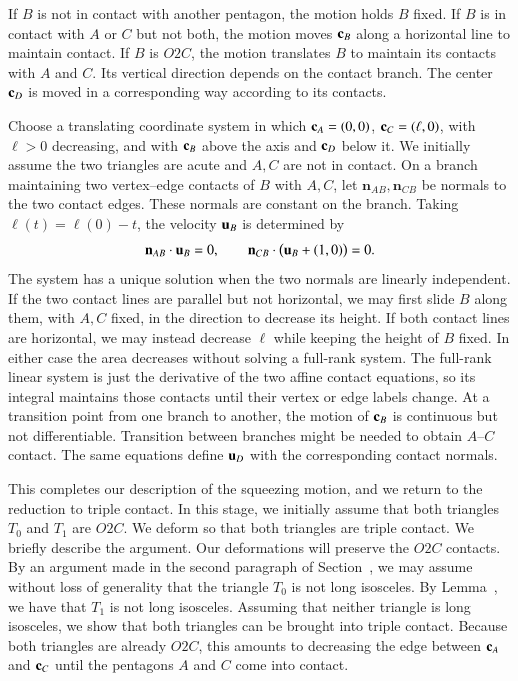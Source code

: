 If $B$ is not in contact with another pentagon, the motion holds $B$ fixed.
If $B$ is in contact with $A$ or $C$ but not both, the motion
moves ${\mathbf c}_B$ along a horizontal line to maintain contact.
If $B$ is $O2C$, the motion translates $B$ to maintain its contacts
with $A$ and $C$. Its vertical direction depends on the contact branch.
The center ${\mathbf c}_D$ is moved in a corresponding way according to its contacts.

Choose a translating coordinate system in which
${\mathbf c}_A=(0,0)$, ${\mathbf c}_C=(\ell,0)$, with $\ell>0$ decreasing,
and with ${\mathbf c}_B$ above the axis and ${\mathbf c}_D$ below it.  We
initially assume the two triangles are acute and $A,C$ are not
in contact.  On a branch maintaining two vertex--edge contacts of
$B$ with $A,C$, let $\mathbf{n}_{AB},\mathbf{n}_{CB}$ be normals to the two
contact edges.  These normals are constant on the branch.  Taking
$\ell(t)=\ell(0)-t$, the velocity ${\mathbf u}_B$ is determined by
\[
\mathbf{n}_{AB}\cdot {\mathbf u}_B=0,\qquad
\mathbf{n}_{CB}\cdot\bigl({\mathbf u}_B+(1,0)\bigr)=0.
\]
The system has a unique solution when the two normals are linearly
independent.  If the two contact lines are parallel but not horizontal, we may
first slide $B$ along them, with $A,C$ fixed, in the direction to
decrease its height. If both contact lines are horizontal, we may
instead decrease $\ell$ while keeping the height of $B$ fixed. In
either case the area decreases without solving a full-rank system.
The full-rank linear system is just the derivative of the two affine contact
equations, so its integral maintains those contacts until their
vertex or edge labels change.  At a transition point from one branch to
another, the motion of ${\mathbf c}_B$ is continuous but not differentiable.
Transition between branches might be needed to obtain $A$--$C$ contact.
The same equations define ${\mathbf u}_D$
with the corresponding contact normals.

This completes our description of the squeezing motion, and we return
to the reduction to triple contact.  In this stage, we initially
assume that both triangles $T_0$ and $T_1$ are $O2C$.  We deform so
that both triangles are triple contact.  We briefly describe the
argument.  Our deformations will preserve the $O2C$ contacts.  By an
argument made in the second paragraph of Section~, we may
assume without loss of generality that the triangle $T_0$ is not long
isosceles.  By Lemma~, we have that $T_1$ is not
long isosceles.  Assuming that neither triangle is long isosceles, we
show that both triangles can be brought into triple contact.  Because
both triangles are already $O2C$, this amounts to decreasing the edge
between ${\mathbf c}_A$ and ${\mathbf c}_C$ until the pentagons $A$ and $C$ come into
contact.


